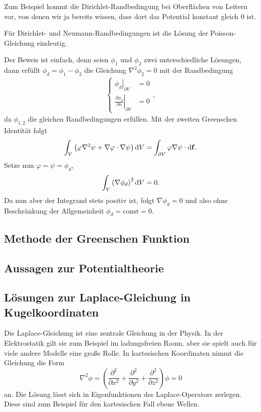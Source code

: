Zum Beispiel kommt die Dirichlet-Randbedingung bei Oberflächen von Leitern vor, von denen wir ja bereits wissen, dass dort das Potential konstant gleich $0$ ist.
\begin{formal}
	Für Dirichlet- und Neumann-Randbedingungen ist die Lösung der Poisson-Gleichung eindeutig.
\end{formal}
Der Beweis ist einfach, denn seien $\phi _{1}$ und $\phi _{2}$ zwei unterschiedliche Lösungen, dann erfüllt $\phi _{d}=\phi _{1}-\phi _{2}$ die Gleichung $\nabla ^{2}\phi _{2}=0$ mit der Randbedingung
\begin{align*}
	\begin{cases} \left.\phi _{d}\right| _{\partial V}                             & =0 \\
              \left.\frac{\partial \phi _{d}}{\partial n}\right| _{\partial V} & =0
	\end{cases} ,
\end{align*}
da $\phi _{1,2}$ die gleichen Randbedingungen erfüllen. Mit der zweiten Greenschen Identität folgt
\begin{equation*}
	\int _{V}\left(\varphi \nabla ^{2}\psi +\nabla \varphi \cdot \nabla \psi \right)\mathop{}\!\mathrm{d} V=\int _{\partial V}\varphi \nabla \psi \cdot \mathop{}\!\mathrm{d} \mathbf{f}.
\end{equation*}
Setze nun $\varphi =\psi =\phi _{d}$,
\begin{equation*}
	\int _{V}\left(\nabla \phi _{d}\right)^{2}\mathop{}\!\mathrm{d} V=0.
\end{equation*}
Da nun aber der Integrand stets positiv ist, folgt $\nabla \phi _{d}=0$ und also ohne Beschränkung der Allgemeinheit $\phi _{d}=\text{const}=0$.


\subsection{Methode der Greenschen Funktion}

\subsection{Aussagen zur Potentialtheorie}

\subsection{Lösungen zur Laplace-Gleichung in Kugelkoordinaten}

Die Laplace-Gleichung ist eine zentrale Gleichung in der Physik. In der Elektrostatik gilt sie zum Beispiel im ladungsfreien Raum, aber sie spielt auch für viele andere Modelle eine große Rolle. In kartesischen Koordinaten nimmt die Gleichung die Form
\begin{equation*}
	\nabla ^{2}\phi =\left(\frac{\partial ^{2}}{\partial x^{2}}+\frac{\partial ^{2}}{\partial y^{2}}+\frac{\partial ^{2}}{\partial z^{2}}\right)\phi =0
\end{equation*}
an. Die Lösung lässt sich in Eigenfunktionen des Laplace-Operators zerlegen. Diese sind zum Beispiel für den kartesischen Fall ebene Wellen.

